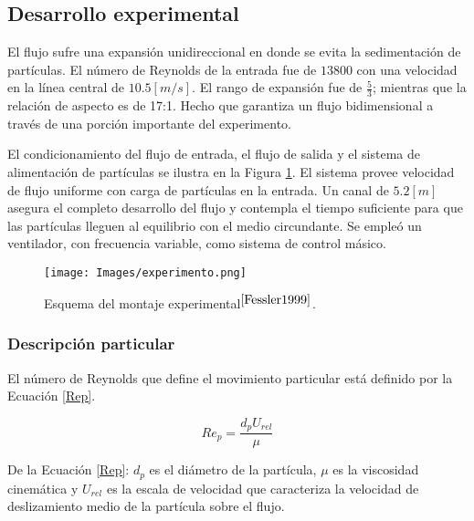 \noindent
\justify

\subsection{Desarrollo experimental}

\noindent
\justify

El flujo sufre una expansi\'on unidireccional en donde se evita la sedimentaci\'on de part\'iculas. El n\'umero de Reynolds de la entrada fue de $13800$ con una velocidad en la l\'inea central de $10.5 [m/s]$. El rango de expansi\'on fue de $\frac{5}{3}$; mientras que la relaci\'on de aspecto es de 17:1. Hecho que garantiza un flujo bidimensional a trav\'es de una porci\'on importante del experimento.

\noindent
\justify

El condicionamiento del flujo de entrada, el flujo de salida y el sistema de alimentaci\'on de part\'iculas se ilustra en la Figura \ref{experimento}. El sistema provee velocidad de flujo uniforme con carga de part\'iculas en la entrada. Un canal de $5.2 [m]$ asegura el completo desarrollo del flujo y contempla el tiempo suficiente para que las part\'iculas lleguen al equilibrio con el medio circundante. Se emple\'o un ventilador, con frecuencia variable, como sistema de control m\'asico.

\begin{figure}[h!]
	\centering
	\texttt{[image: Images/experimento.png]}
	\caption{Esquema del montaje experimental$^{\cite{Fessler1999}}$.}
	\label{experimento}
\end{figure}

\subsubsection{Descripci\'on particular}

\noindent
\justify

El n\'umero de Reynolds que define el movimiento particular est\'a definido por la Ecuaci\'on \ref{Rep}.

\begin{equation}
	Re_p = \frac{d_p U_{rel}}{\mu}
	\label{Rep}
\end{equation}

\noindent
\justify

De la Ecuaci\'on \ref{Rep}: $d_p$ es el di\'ametro de la part\'icula, $\mu$ es la viscosidad cinem\'atica y $U_{rel}$ es la escala de velocidad que caracteriza la velocidad de deslizamiento medio de la part\'icula sobre el flujo.

